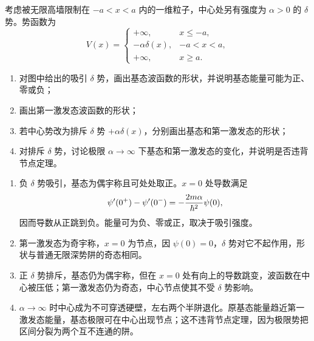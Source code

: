 
\begin{question}
考虑被无限高墙限制在 $-a<x<a$ 内的一维粒子，中心处另有强度为 $\alpha>0$ 的 $\delta$ 势。势函数为
\[
V(x)=\begin{cases}
+\infty,&x\le -a,\\
-\alpha\delta(x),&-a<x<a,\\
+\infty,&x\ge a.
\end{cases}
\]
\begin{enumerate}
  \item 对图中给出的吸引 $\delta$ 势，画出基态波函数的形状，并说明基态能量可能为正、零或负；
  \item 画出第一激发态波函数的形状；
  \item 若中心势改为排斥 $\delta$ 势 $+\alpha\delta(x)$，分别画出基态和第一激发态的形状；
  \item 对排斥 $\delta$ 势，讨论极限 $\alpha\to\infty$ 下基态和第一激发态的变化，并说明是否违背节点定理。
\end{enumerate}
\begin{solution}
\begin{enumerate}
  \item 负 $\delta$ 势吸引，基态为偶宇称且可处处取正。$x=0$ 处导数满足
  \[
    \psi'(0^+)-\psi'(0^-)=-{2m\alpha\over\hbar^2}\psi(0),
  \]
  因而导数从正跳到负。能量可为负、零或正，取决于吸引强度。
  \item 第一激发态为奇宇称，$x=0$ 为节点，因 $\psi(0)=0$，$\delta$ 势对它不起作用，形状与普通无限深势阱的奇态相同。
  \item 正 $\delta$ 势排斥，基态仍为偶宇称，但在 $x=0$ 处有向上的导数跳变，波函数在中心被压低；第一激发态仍为奇态，中心节点使其不受 $\delta$ 势影响。
  \item $\alpha\to\infty$ 时中心成为不可穿透硬壁，左右两个半阱退化。原基态能量趋近第一激发态能量，基态极限可在中心出现节点；这不违背节点定理，因为极限势把区间分裂为两个互不连通的阱。
\end{enumerate}
\end{solution}
\end{question}

